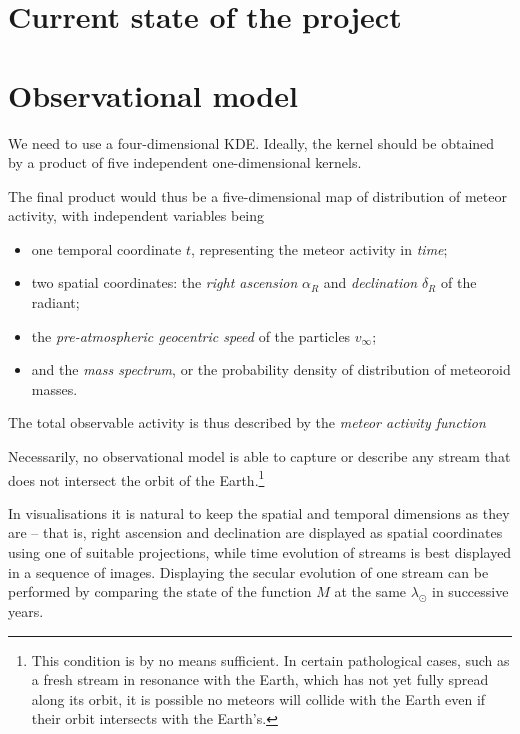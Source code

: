 \section{Current state of the project} \label{pc}

\section{Observational model} \label{ps}
    We need to use a four-dimensional KDE. Ideally, the kernel should be obtained by a product of five
    independent one-dimensional kernels.

    The final product would thus be a five-dimensional map of distribution of meteor activity, with independent variables being
    \begin{itemize}
        \item one temporal coordinate $t$, representing the meteor activity in \emph{time};
        \item two spatial coordinates: the \emph{right ascension} $\alpha_R$ and \emph{declination} $\delta_R$ of the radiant;
        \item the \emph{pre-atmospheric geocentric speed} of the particles $v_\infty$;
        \item and the \emph{mass spectrum}, or the probability density of distribution of meteoroid masses.
    \end{itemize}

    The total observable activity is thus described by the \emph{meteor activity function}

    Necessarily, no observational model is able to capture or describe any stream that does not intersect the orbit of the
    Earth.\footnote{This condition is by no means sufficient. In certain pathological cases, such as a fresh stream in resonance
    with the Earth, which has not yet fully spread along its orbit, it is possible no meteors will collide with the Earth even
    if their orbit intersects with the Earth's.}

    In visualisations it is natural to keep the spatial and temporal dimensions as they are -- that is,
    right ascension and declination are displayed as spatial coordinates using one of suitable projections,
    while time evolution of streams is best displayed in a sequence of images.
    Displaying the secular evolution of one stream can be performed by comparing the state of the function $M$ at
    the same $\lambda_\odot$ in successive years.

